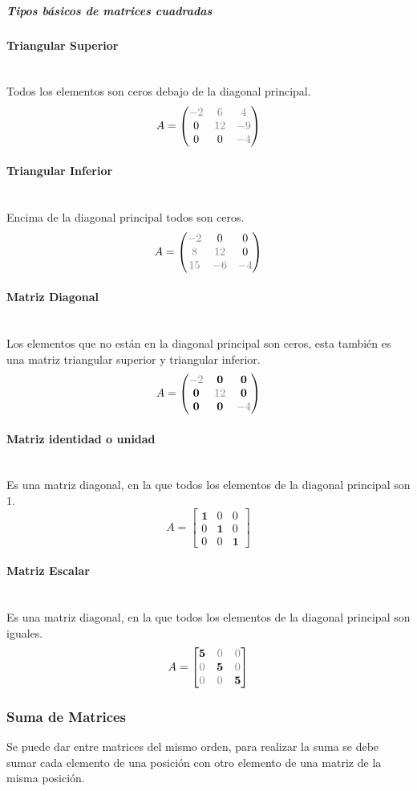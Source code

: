 \documentclass[stu, 12pt, letterpaper, donotrepeattitle, floatsintext, natbib]{apa7}
\newcommand{\myparagraph}[1]{\paragraph{#1}\mbox{}\\}
\begin{document}
\subparagraph{Tipos básicos de matrices cuadradas}
\myparagraph{Triangular Superior}
Todos los elementos son ceros debajo de la diagonal principal.
$$
A=\begin{pmatrix}
\color{gray} -2 & \color{gray} 6 & \color{gray} 4 \\
0 & \color{gray} 12 & \color{gray} -9 \\
0 & 0 & \color{gray} -4
\end{pmatrix}
$$
\myparagraph{Triangular Inferior}
Encima de la diagonal principal todos son ceros.
$$
A=\begin{pmatrix}
\color{gray} -2 & 0 & 0 \\
\color{gray} 8 & \color{gray} 12 & 0 \\
\color{gray} 15 & \color{gray} -6 & \color{gray} -4
\end{pmatrix}
$$
\myparagraph{Matriz Diagonal}
Los elementos que no están en la diagonal principal son ceros, esta también es una matriz triangular superior y triangular inferior.
$$
A=\begin{pmatrix}
\color{gray} -2 & \textbf{0} & \textbf{0} \\
\textbf{0} & \color{gray} 12 & \textbf{0} \\
\textbf{0} & \textbf{0} & \color{gray} -4
\end{pmatrix}
$$
\myparagraph{Matriz identidad o unidad}
Es una matriz diagonal, en la que todos los elementos de la diagonal principal son 1.
\[
A=\begin{bmatrix}
\textbf{1} & 0 & 0 \\ 
0 & \textbf{1} & 0 \\
0 & 0 & \textbf{1}
\end{bmatrix}
\]
\myparagraph{Matriz Escalar}
Es una matriz diagonal, en la que todos los elementos de la diagonal principal son iguales.
\[
A=\begin{bmatrix}
\textbf{5} & \color{gray} 0 & \color{gray} 0 \\ 
 \color{gray} 0 & \textbf{5} & \color{gray} 0 \\
 \color{gray}0 &  \color{gray} 0 & \textbf{5}
\end{bmatrix}
\]
\subsubsection{Suma de Matrices}
Se puede dar entre matrices del mismo orden, para realizar la suma se debe sumar cada elemento de una posición con otro elemento de una matriz de la misma posición.
\end{document}
